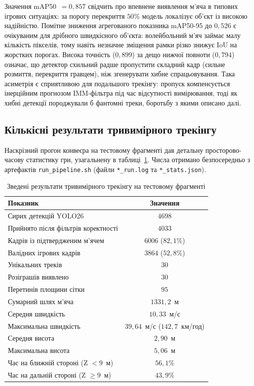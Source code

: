 Значення mAP50~$=0{,}857$ свідчить про впевнене виявлення м'яча в типових ігрових
ситуаціях: за порогу перекриття $50\%$ модель локалізує об'єкт із високою надійністю.
Помітне зниження агрегованого показника mAP50-95 до $0{,}526$ є очікуваним для дрібного
швидкісного об'єкта: волейбольний м'яч займає малу кількість пікселів, тому навіть
незначне зміщення рамки різко знижує \gls{IoU} на жорстких порогах. Висока точність
($0{,}899$) за дещо нижчої повноти ($0{,}794$) означає, що детектор схильний радше
пропустити складний кадр (сильне розмиття, перекриття гравцем), ніж згенерувати хибне
спрацьовування. Така асиметрія є сприятливою для подальшого трекінгу: пропуск
компенсується інерційним прогнозом \gls{IMM}-фільтра під час відсутності вимірювання,
тоді як хибні детекції породжували б фантомні треки, боротьбу з якими описано далі.

\subsection{Кількісні результати тривимірного трекінгу}

Наскрізний прогон конвеєра на тестовому фрагменті дав детальну просторово-часову
статистику гри, узагальнену в таблиці~\ref{tab:tracking_stats}. Числа отримано
безпосередньо з артефактів \texttt{run\_pipeline.sh} (файли \texttt{*\_run.log} та
\texttt{*\_stats.json}).

\begin{table}[H]
\centering
\fontsize{11pt}{13pt}\selectfont
\caption{Зведені результати тривимірного трекінгу на тестовому фрагменті}
\label{tab:tracking_stats}
\begin{tabular}{|l|c|}
\hline
\textbf{Показник} & \textbf{Значення} \\
\hline
Сирих детекцій \gls{YOLO}26 & $4698$ \\
Прийнято після фільтрів коректності & $4033$ \\
Кадрів із підтвердженим м'ячем & $6006$ ($82{,}1\%$) \\
Валідних ігрових кадрів & $3864$ ($52{,}8\%$) \\
Унікальних треків & $30$ \\
Розіграшів виявлено & $30$ \\
Перетинів площини сітки & $95$ \\
Сумарний шлях м'яча & $1331{,}2$~м \\
Середня швидкість & $10{,}33$~м/с \\
Максимальна швидкість & $39{,}64$~м/с ($142{,}7$~км/год) \\
Середня висота & $2{,}90$~м \\
Максимальна висота & $5{,}06$~м \\
Час на ближній стороні (Z $<9$~м) & $56{,}1\%$ \\
Час на дальній стороні (Z $\geq 9$~м) & $43{,}9\%$ \\
\hline
\end{tabular}
\end{table}

